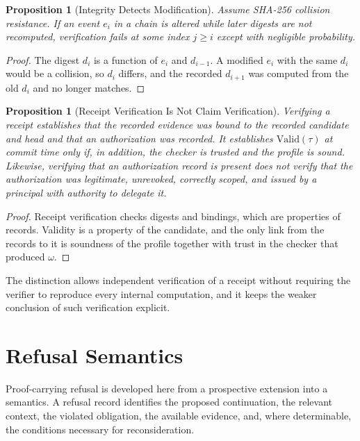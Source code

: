 \documentclass[12pt,oneside,openany]{book}
\theoremstyle{spherepop}
\newtheorem{proposition}[definition]{Proposition}
\theoremstyle{remarkstyle}
\begin{document}
\begin{proposition}[Integrity Detects Modification]
Assume SHA-256 collision resistance. If an event $e_i$ in a chain is altered while later digests are not recomputed, verification fails at some index $j\ge i$ except with negligible probability.
\end{proposition}

\begin{proof}
The digest $d_i$ is a function of $e_i$ and $d_{i-1}$. A modified $e_i$ with the same $d_i$ would be a collision, so $d_i$ differs, and the recorded $d_{i+1}$ was computed from the old $d_i$ and no longer matches.
\end{proof}

\begin{proposition}[Receipt Verification Is Not Claim Verification]
Verifying a receipt establishes that the recorded evidence was bound to the recorded candidate and head and that an authorization was recorded. It establishes $\mathrm{Valid}(\tau)$ at commit time only if, in addition, the checker is trusted and the profile is sound. Likewise, verifying that an authorization record is present does not verify that the authorization was legitimate, unrevoked, correctly scoped, and issued by a principal with authority to delegate it.
\end{proposition}

\begin{proof}
Receipt verification checks digests and bindings, which are properties of records. Validity is a property of the candidate, and the only link from the records to it is soundness of the profile together with trust in the checker that produced $\omega$.
\end{proof}

The distinction allows independent verification of a receipt without requiring the verifier to reproduce every internal computation, and it keeps the weaker conclusion of such verification explicit.

\chapter{Refusal Semantics}
\label{ch:refusal}

Proof-carrying refusal is developed here from a prospective extension into a semantics. A refusal record identifies the proposed continuation, the relevant context, the violated obligation, the available evidence, and, where determinable, the conditions necessary for reconsideration.
\end{document}
